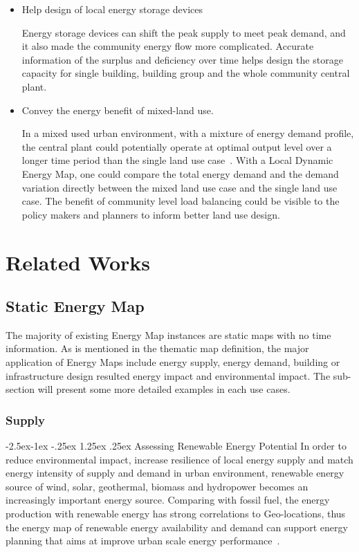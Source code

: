\documentclass[hidelinks,12pt]{article}
\makeatletter
\renewcommand\paragraph{\@startsection{paragraph}{4}{\z@}%
            {-2.5ex\@plus -1ex \@minus -.25ex}%
            {1.25ex \@plus .25ex}%
            {\normalfont\normalsize\bfseries}}
\makeatother
\begin{document}
\begin{itemize}
\item Help design of local energy storage devices

  Energy storage devices can shift the peak supply to meet peak
  demand, and it also made the community energy flow more
  complicated. Accurate information of the surplus and deficiency over
  time helps design the storage capacity for single building, building
  group and the whole community central plant.

\item Convey the energy benefit of mixed-land use.

  In a mixed used urban environment, with a mixture of energy demand
  profile, the central plant could potentially operate at optimal
  output level over a longer time period than the single land use
  case~\cite{IDEA2005}. With a Local Dynamic Energy Map, one could
  compare the total energy demand and the demand variation directly
  between the mixed land use case and the single land use case. The
  benefit of community level load balancing could be visible to the
  policy makers and planners to inform better land use design.
  
\end{itemize}

\newpage
\section{Related Works}
\subsection{Static Energy Map}
The majority of existing Energy Map instances are static maps with no
time information. As is mentioned in the thematic map definition, the
major application of Energy Maps include energy supply, energy demand,
building or infrastructure design resulted energy impact and
environmental impact. The sub-section will present some more detailed
examples in each use cases.

\subsubsection{Supply}
\paragraph{Assessing Renewable Energy Potential}
In order to reduce environmental impact, increase resilience of local
energy supply and match energy intensity of supply and demand in urban
environment, renewable energy source of wind, solar, geothermal,
biomass and hydropower becomes an increasingly important energy
source. Comparing with fossil fuel, the energy production with
renewable energy has strong correlations to Geo-locations, thus the
energy map of renewable energy availability and demand can support
energy planning that aims at improve urban scale energy
performance~\cite{Ramachandra20071460}.
\end{document}
